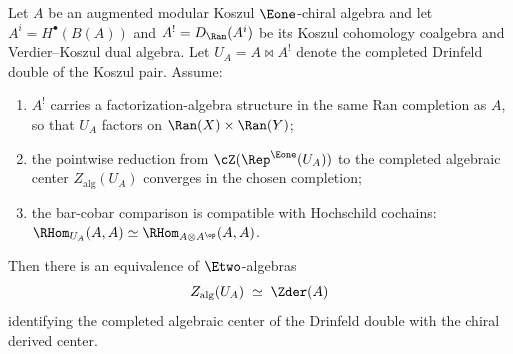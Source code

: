 \begin{conjecture}
\label{conj:v3-drinfeld-center-equals-bulk}
\ClaimStatusConjectured
Let $A$ be an augmented modular Koszul $\Eone$-chiral algebra and let
$A^i=H^\bullet(B(A))$ and $A^!=D_{\Ran}(A^i)$ be its Koszul
cohomology coalgebra and Verdier--Koszul dual algebra. Let
$U_A=A\bowtie A^!$ denote the completed Drinfeld double of the Koszul
pair. Assume:
\begin{enumerate}[label=\textup{(\roman*)}]
 \item $A^!$ carries a factorization-algebra structure in the same
 Ran completion as $A$, so that $U_A$ factors on
 $\Ran(X)\times\Ran(Y)$;
 \item the pointwise reduction from
 $\cZ(\Rep^{\Eone}(U_A))$ to the completed algebraic center
 $Z_{\mathrm{alg}}(U_A)$ converges in the chosen completion;
 \item the bar-cobar comparison is compatible with Hochschild
 cochains:
 $\RHom_{U_A}(A,A)\simeq\RHom_{A\otimes A^{\op}}(A,A)$.
\end{enumerate}
Then there is an equivalence of $\Etwo$-algebras
\[
 Z_{\mathrm{alg}}(U_A) \;\simeq\; \Zder(A)
\]
identifying the completed algebraic center of the Drinfeld double
with the chiral derived center.
\end{conjecture}

